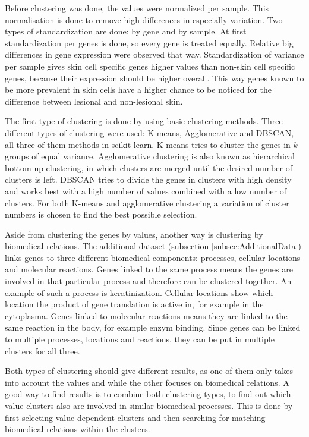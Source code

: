 \documentclass[10pt,a4paper]{article}
\begin{document}
	Before clustering was done, the values were normalized per sample. This normalisation is done to remove high differences in especially variation. Two types of standardization are done: by gene and by sample. At first standardization per genes is done, so every gene is treated equally. Relative big differences in gene expression were observed that way. Standardization of variance per sample gives skin cell specific genes higher values than non-skin cell specific genes, because their expression should be higher overall. This way genes known to be more prevalent in skin cells have a higher chance to be noticed for the difference between lesional and non-lesional skin.
	
	The first type of clustering is done by using basic clustering methods. Three different types of clustering were used: K-means, Agglomerative and DBSCAN, all three of them methods in scikit-learn. K-means tries to cluster the genes in $k$ groups of equal variance. Agglomerative clustering is also known as hierarchical bottom-up clustering, in which clusters are merged until the desired number of clusters is left. DBSCAN tries to divide the genes in clusters with high density and works best with a high number of values combined with a low number of clusters. For both K-means and agglomerative clustering a variation of cluster numbers is chosen to find the best possible selection. 
	
	Aside from clustering the genes by values, another way is clustering by biomedical relations. The additional dataset (subsection \ref{subsec:AdditionalData}) links genes to three different biomedical components: processes, cellular locations and molecular reactions. Genes linked to the same process means the genes are involved in that particular process and therefore can be clustered together. An example of such a process is keratinization. Cellular locations show which location the product of gene translation is active in, for example in the cytoplasma. Genes linked to molecular reactions means they are linked to the same reaction in the body, for example enzym binding. Since genes can be linked to multiple processes, locations and reactions, they can be put in multiple clusters for all three.
	
	Both types of clustering should give different results, as one of them only takes into account the values and while the other focuses on biomedical relations. A good way to find results is to combine both clustering types, to find out which value clusters also are involved in similar biomedical processes. This is done by first selecting value dependent clusters and then searching for matching biomedical relations within the clusters.
	
\end{document}
